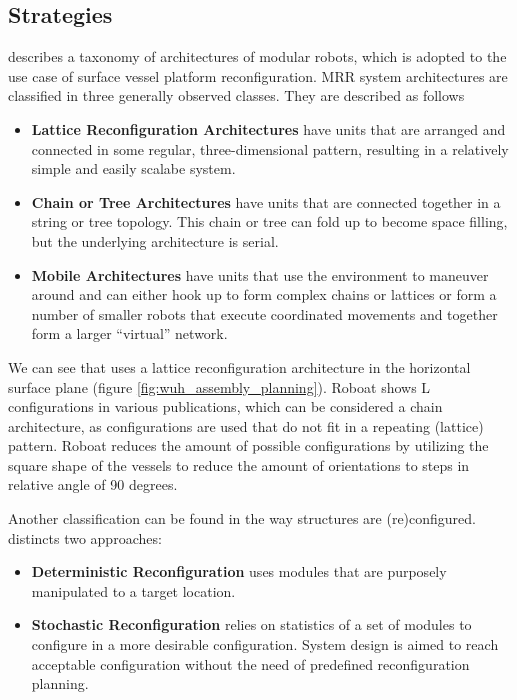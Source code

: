 \subsection{Strategies}
\citet{yim2007modular} describes a taxonomy of architectures of modular robots, which is adopted to the use case of surface vessel platform reconfiguration. MRR system architectures are classified in three generally observed classes. They are described as follows \cite{yim2007modular}
\begin{itemize}
	\item \textbf{Lattice Reconfiguration Architectures} have units that are arranged and connected in some regular, three-dimensional pattern, resulting in a relatively simple and easily scalabe system. 
	\item \textbf{Chain or Tree Architectures} have	units that are connected together in a string or tree topology. This chain or tree can fold up to become space filling, but the underlying architecture is serial.
	\item \textbf{Mobile Architectures} have units that use the environment to maneuver around and can either hook up to form complex chains or lattices or form a number of smaller robots that execute coordinated movements and together form a larger	“virtual” network. 
\end{itemize}

We can see that \citet{o2014self} uses a lattice reconfiguration architecture in the horizontal surface plane (figure \ref{fig:wuh_assembly_planning}). Roboat shows L configurations in various publications, which can be considered a chain architecture, as configurations are used that do not fit in a repeating (lattice) pattern. Roboat reduces the amount of possible configurations by utilizing the square shape of the vessels to reduce the amount of orientations to steps in relative angle of 90 degrees.

Another classification can be found in the way structures are (re)configured. \citet{yim2007modular} distincts two approaches:
\begin{itemize}
	\item \textbf{Deterministic Reconfiguration} uses modules that are purposely manipulated to a target location.
	\item \textbf{Stochastic Reconfiguration} relies on statistics of a set of modules to configure in a more desirable configuration. System design is aimed to reach acceptable configuration without the need of predefined reconfiguration planning.
\end{itemize}

